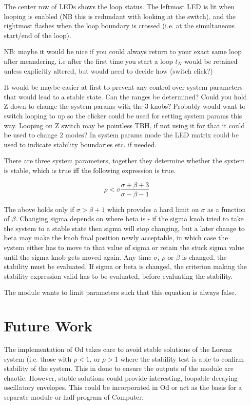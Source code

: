 \documentclass{tufte-handout}
\begin{document}
The center row of LEDs shows the loop status. The leftmost LED is lit when looping is enabled (NB this is redundant with looking at the switch), and the rightmost flashes when the loop boundary is crossed (i.e. at the simultaneous start/end of the loop).

NB: maybe it would be nice if you could always return to your exact same loop after meandering, i.e after the first time you start a loop $t_N$ would be retained unless explicitly altered, but would need to decide how (switch click?)

It would be maybe easier at first to prevent any control over system parameters that would lead to a stable state. Can the ranges be determined? Could you hold Z down to change the system params with the 3 knobs? Probably would want to switch looping to up so the clicker could be used for setting system params this way. Looping on Z switch may be pointless TBH, if not using it for that it could be used to change 2 modes? In system params mode the LED matrix could be used to indicate stability boundaries etc. if needed.

There are three system parameters, together they determine whether the system is stable, which is true iff the following expression is true.

$$\rho < \sigma \frac{\sigma + \beta + 3}{\sigma - \beta - 1}$$ 

The above holds only if $\sigma > \beta + 1$ which provides a hard limit on $\sigma$ as a function of $\beta$. Changing sigma depends on where beta is - if the sigma knob tried to take the system to a stable state then sigma will stop changing, but a later change to beta may make the knob final position newly acceptable, in which case the system either has to move to that value of sigma or retain the stuck sigma value until the sigma knob gets moved again.
Any time $\sigma$, $\rho$ or $\beta$ is changed, the stability must be evaluated. If sigma or beta is changed, the criterion making the stability expression valid has to be evaluated, before evaluating the stability.

The module wants to limit parameters such that this equation is always false.

\section{Future Work}\label{sec:future_work}

The implementation of Od takes care to avoid stable solutions of the Lorenz system (i.e. those with $\rho < 1$, or $\rho > 1$ where the stability test is able to confirm stability of the system. This in done to ensure the outputs of the module are chaotic. However, stable solutions could provide interesting, loopable decaying oscillatory envelopes. This could be incorporated in Od or act as the basis for a separate module or half-program of Computer.




\end{document}
